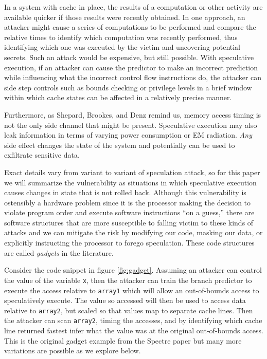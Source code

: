 \documentclass[11pt,conference]{IEEEtran}
\begin{document}
In a system with cache in place, the results of a computation or other activity are available quicker if those results were recently obtained.
In one approach, an attacker might cause a series of computations to be performed and compare the relative times to identify which computation was recently performed, thus identifying which one was executed by the victim and uncovering potential secrets.
Such an attack would be expensive, but still possible.
With speculative execution, if an attacker can cause the predictor to make an incorrect prediction while influencing what the incorrect control flow instructions do, the attacker can side step controls such as bounds checking or privilege levels in a brief window within which cache states can be affected in a relatively precise manner.

Furthermore, as Shepard, Brookes, and Denz\cite{shepherd2022transient} remind us, memory access timing is not the only side channel that might be present.
Speculative execution may also leak information in terms of varying power consumption or EM radiation.
\emph{Any} side effect changes the state of the system and potentially can be used to exfiltrate sensitive data.

Exact details vary from variant to variant of speculation attack, so for this paper we will summarize the vulnerability as situations in which speculative execution causes changes in state that is not rolled back.
Although this vulnerability is ostensibly a hardware problem since it is the processor making the decision to violate program order and execute software instructions ``on a guess,'' there are software structures that are more susceptible to falling victim to these kinds of attacks and we can mitigate the risk by modifying our code, masking our data, or explicitly instructing the processor to forego speculation.
These code structures are called \emph{gadgets} in the literature.

Consider the code snippet in figure \ref{fig:gadget}.
Assuming an attacker can control the value of the variable \texttt{x}, then the attacker can train the branch predictor to execute the access relative to \texttt{array1} which will allow an out-of-bounds access to speculatively execute.
The value so accessed will then be used to access data relative to \texttt{array2}, but scaled so that values map to separate cache lines.
Then the attacker can scan \texttt{array2}, timing the accesses, and by identifying which cache line returned fastest infer what the value was at the original out-of-bounds access.
This is the original gadget example from the Spectre paper but many more variations are possible as we explore below.
\end{document}

